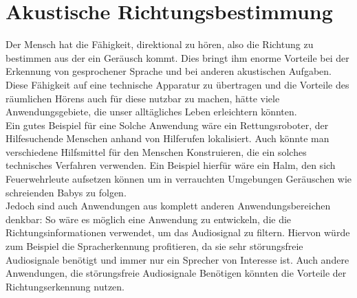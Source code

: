 \section{Akustische Richtungsbestimmung}
Der Mensch hat die Fähigkeit, direktional zu hören, also die Richtung zu bestimmen aus der ein Geräusch kommt. Dies bringt ihm enorme Vorteile bei der Erkennung von gesprochener Sprache und bei anderen akustischen Aufgaben. Diese Fähigkeit auf eine technische Apparatur zu übertragen und die Vorteile des räumlichen Hörens auch für diese nutzbar zu machen, hätte viele Anwendungsgebiete, die unser alltägliches Leben erleichtern könnten.\\
Ein gutes Beispiel für eine Solche Anwendung wäre ein Rettungsroboter, der Hilfesuchende Menschen anhand von Hilferufen lokalisiert. Auch könnte man verschiedene Hilfsmittel für den Menschen Konstruieren, die ein solches technisches Verfahren verwenden. Ein Beispiel hierfür wäre ein Halm, den sich Feuerwehrleute aufsetzen können um in verrauchten Umgebungen Geräuschen wie schreienden Babys zu folgen.\\
Jedoch sind auch Anwendungen aus komplett anderen Anwendungsbereichen denkbar: So wäre es möglich eine Anwendung zu entwickeln, die die Richtungsinformationen verwendet, um das Audiosignal zu filtern. Hiervon würde zum Beispiel die Spracherkennung profitieren, da sie sehr störungsfreie Audiosignale benötigt und immer nur ein Sprecher von Interesse ist\cite{Spracherkennung}. Auch andere Anwendungen, die störungsfreie Audiosignale Benötigen könnten die Vorteile der Richtungserkennung nutzen. 
